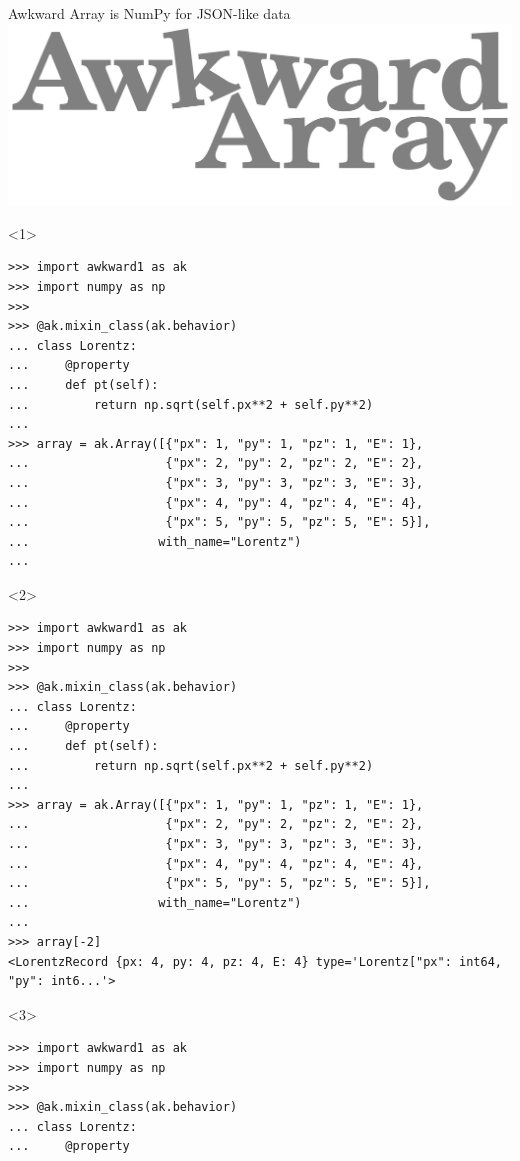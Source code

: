 \documentclass[aspectratio=169]{beamer}
\begin{document}
\begin{frame}[fragile]{Awkward Array is NumPy for JSON-like data}
\vspace{0.2 cm}
\hfill \mbox{\includegraphics[height=1.5 cm]{awkward-logo.pdf}\hspace{-0.85 cm}}

\vspace{-1.5 cm}
\scriptsize
\begin{onlyenv}<1>
\begin{verbatim}
>>> import awkward1 as ak
>>> import numpy as np
>>> 
>>> @ak.mixin_class(ak.behavior)
... class Lorentz:
...     @property
...     def pt(self):
...         return np.sqrt(self.px**2 + self.py**2)
... 
>>> array = ak.Array([{"px": 1, "py": 1, "pz": 1, "E": 1},
...                   {"px": 2, "py": 2, "pz": 2, "E": 2},
...                   {"px": 3, "py": 3, "pz": 3, "E": 3},
...                   {"px": 4, "py": 4, "pz": 4, "E": 4},
...                   {"px": 5, "py": 5, "pz": 5, "E": 5}],
...                  with_name="Lorentz")
... 
\end{verbatim}
\vspace{3 cm}
\end{onlyenv}
\begin{onlyenv}<2>
\begin{verbatim}
>>> import awkward1 as ak
>>> import numpy as np
>>> 
>>> @ak.mixin_class(ak.behavior)
... class Lorentz:
...     @property
...     def pt(self):
...         return np.sqrt(self.px**2 + self.py**2)
... 
>>> array = ak.Array([{"px": 1, "py": 1, "pz": 1, "E": 1},
...                   {"px": 2, "py": 2, "pz": 2, "E": 2},
...                   {"px": 3, "py": 3, "pz": 3, "E": 3},
...                   {"px": 4, "py": 4, "pz": 4, "E": 4},
...                   {"px": 5, "py": 5, "pz": 5, "E": 5}],
...                  with_name="Lorentz")
... 
>>> array[-2]
<LorentzRecord {px: 4, py: 4, pz: 4, E: 4} type='Lorentz["px": int64, "py": int6...'>
\end{verbatim}
\vspace{3 cm}
\end{onlyenv}
\begin{onlyenv}<3>
\begin{verbatim}
>>> import awkward1 as ak
>>> import numpy as np
>>> 
>>> @ak.mixin_class(ak.behavior)
... class Lorentz:
...     @property

\end{verbatim}
\end{onlyenv}
\end{frame}
\end{document}
